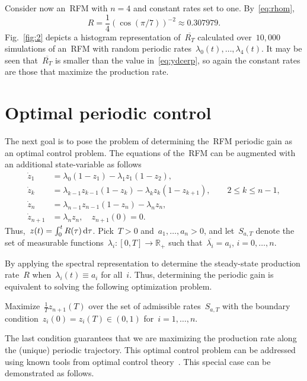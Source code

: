 Consider now  an~\ac{RFM} with $n=4$ and constant rates set to one. 
By~\eqref{eq:rhom},
%
\begin{equation}\label{eq:ydcerp}
	R=\frac{1}{4}(\cos (  \pi/7))^{-2}\approx 0.307979.
\end{equation}
%
Fig.~\ref{fig:2} depicts a histogram representation of~$\overline{R_T}$ calculated over~$10,000$ simulations of an~\ac{RFM} with  random  periodic rates~$\lambda_0(t),\dots,\lambda_4(t)$.
It may be seen that~$\overline{R_T}$ is smaller than the value in~\eqref{eq:ydcerp}, so again the constant rates are those that maximize the production rate.  


\section{Optimal periodic control} \label{sec:optpercont}

The next goal is to pose the problem of determining the~\ac{RFM} periodic gain as an optimal control problem. 
The equations of the~\ac{RFM} can be augmented with an additional state-variable as follows 
%
\begin{subequations}\label{eq:rfm_aog}
	\begin{align}
		\dot z _1  &= \lambda_0 (1-z _1 )  - \lambda_1 z _1  (1-z _2 ), \\
		\dot z _k  &= \lambda_{k-1} z _{k-1}  (1-z _k )  - 
		\lambda_k z _k  (1-z _{k+1} ), \qquad 2\leq k \leq n-1, \\
		\dot z _n  &= \lambda_{n-1} z _{n-1}  (1-z _n )  - \lambda_n z_n ,\\
		\dot z_{n+1}&=\lambda_n z_n,\quad z_{n+1}(0)=0.
	\end{align}
\end{subequations} 
%
Thus,~$z(t)=\int_0^t R(\tau) \mathop{}\!\mathrm{d} \tau$. 
Pick~$T>0$ and~$a_1,\dots,a_n>0$, and let~$S_{a,T}$ denote the set of measurable functions~$\lambda_i:[0,T]\to\mathbb{R}_+$ such that~$\overline{\lambda_i}=a_i$, $i=0,\dots,n$. 

By applying the spectral representation to determine  the steady-state production rate~$R$ when~$\lambda_i(t)\equiv a_i$ for all~$i$. 
Thus, determining the periodic gain is  equivalent to solving the following optimization problem.

\begin{problem} \label{prob:maxi}
	Maximize~$\frac{1}{T}z_{n+1}(T)$ over the set of admissible rates~$S_{a,T}$   with the boundary condition~$z_i(0)=z_i(T) \in (0,1)$ for~$i=1,\dots,n$.
\end{problem}
%
The last condition guarantees that we are maximizing  the production rate along the (unique) periodic trajectory. 
This optimal control problem can be addressed using known tools from optimal control theory~\cite{pontryagin,LeeMarkus,liberzon}. 
This special case can be demonstrated as follows.

